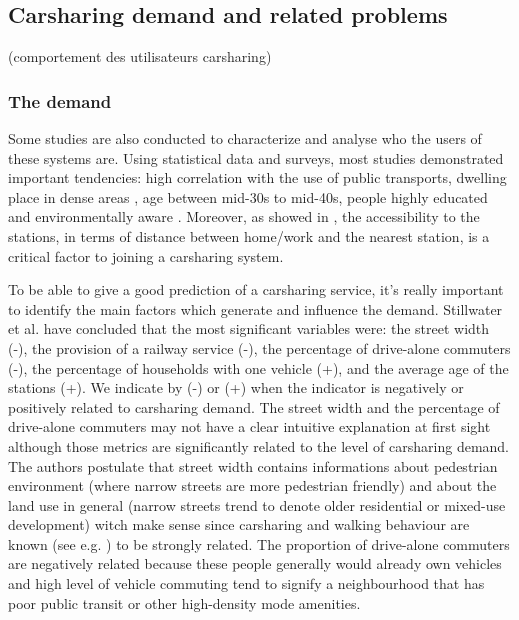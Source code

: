 \begin{bibunit}[ieeetr]

\subsection{Carsharing demand and related problems}

\cite{leclerc_unraveling_2013} (comportement des utilisateurs carsharing)\\

\subsubsection{The demand}
Some studies are also conducted to characterize and analyse who the users of these systems are.
Using statistical data and surveys, most studies demonstrated important tendencies: high correlation with the use of public transports, dwelling place in dense areas \cite{cervero_city_2003, millard_ball_car_sharing_2005, burkhardt_who_2006}, age between mid-30s to mid-40s, people highly educated and environmentally aware \cite{costain_synopsis_2012, efthymiou_which_2012, millard_ball_car_sharing_2005, brook_carsharingstart_2004, lane_phillycarshare_2005, zheng_carsharing_2009}.
Moreover, as showed in \cite{costain_synopsis_2012, efthymiou_which_2012, zheng_carsharing_2009}, the accessibility to the stations, in terms of distance between home/work and the nearest station, is a critical factor to joining a carsharing system.

To be able to give a good prediction of a carsharing service, it's really important to identify the main factors which generate and influence the demand.
Stillwater et al. \cite{stillwater_carsharing_2009} have concluded that the most significant variables were: the street width (-), the provision of a railway service (-), the percentage of drive-alone commuters (-), the percentage of households with one vehicle (+), and the average age of the stations (+).
We indicate by (-) or (+) when the indicator is negatively or positively related to carsharing demand.
The street width and the percentage of drive-alone commuters may not have a clear intuitive explanation at first sight although those metrics are significantly related to the level of carsharing demand.
The authors postulate that street width contains informations about pedestrian environment (where narrow streets are more pedestrian friendly) and about the land use in general (narrow streets trend to denote older residential or mixed-use development) witch make sense since carsharing and walking behaviour are known (see e.g. \cite{cervero_city_2003}) to be strongly related.
The proportion of drive-alone commuters are negatively related because these people generally would already own vehicles and high level of vehicle commuting tend to signify a neighbourhood that has poor public transit or other high-density mode amenities.


\end{bibunit}
